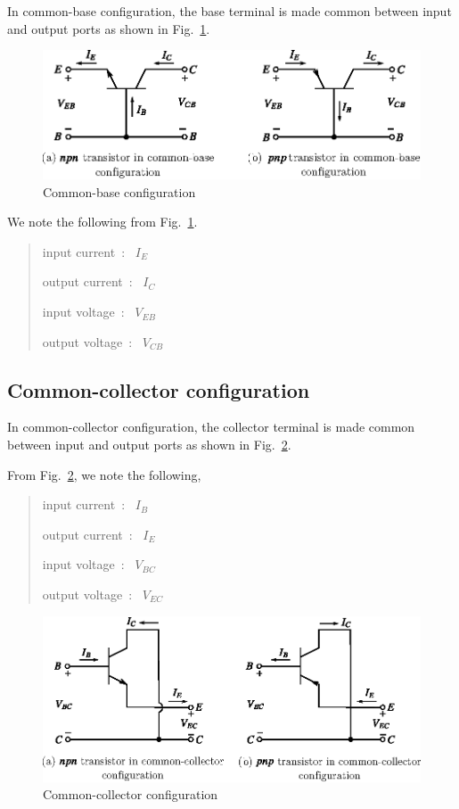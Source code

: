 In common-base configuration, the base terminal is made common between input and output ports as shown in Fig.~\ref{fig3.15}.
\begin{figure}[H]
\centering
\includegraphics{chap2/fig2.15.eps}
\caption{Common-base configuration}\label{fig3.15}
\end{figure}

We note the following from Fig.~\ref{fig3.15}.
\begin{quote}
input current~:~ $I_{E}$

output current~:~ $I_{C}$

input voltage~:~ $V_{EB}$

output voltage~:~ $V_{CB}$
\end{quote}

\subsection{Common-collector configuration}\label{sec3.13.3}

In common-collector configuration, the collector terminal is made common between input and output ports as shown in Fig.~\ref{fig3.16}.

From Fig.~\ref{fig3.16}, we note the following,
\begin{quote}
input current~:~ $I_{B}$

output current~:~ $I_{E}$

input voltage~:~ $V_{BC}$

output voltage~:~ $V_{EC}$
\end{quote}
\begin{figure}[H]
\centering
\includegraphics[scale=.95]{chap2/fig2.16.eps}
\caption{Common-collector configuration}\label{fig3.16}
\end{figure}

